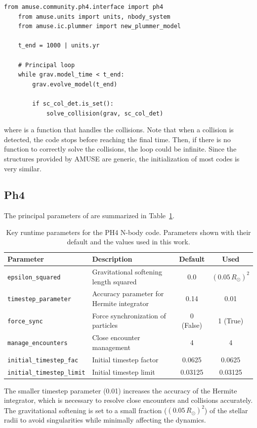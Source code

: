 \begin{lstlisting}[caption=Loop with evolution for \texttt{Ph4}, label=lst:Ph4_loop_evolve]
	from amuse.community.ph4.interface import ph4
	from amuse.units import units, nbody_system
	from amuse.ic.plummer import new_plummer_model
	
	t_end = 1000 | units.yr
	
	# Principal loop
	while grav.model_time < t_end:
		grav.evolve_model(t_end)
		
		if sc_col_det.is_set():
			solve_collision(grav, sc_col_det)
\end{lstlisting}
where  is a function that handles the collisions. Note that when a collision is detected, the code stops before reaching the final time. Then, if there is no function to correctly solve the collisions, the loop could be infinite. Since the structures provided by AMUSE are generic, the initialization of most codes is very similar.

\subsection{Ph4}

The principal parameters of  are summarized in Table~\ref{tab:ph4_parameters}.

\begin{table}[!ht]
	\centering
	\begin{threeparttable}
		\begin{tabular}{l p{5.5cm} c c}
			\hline
			\rowcolor[gray]{0.8}
			\textbf{Parameter} & \textbf{Description} & \textbf{Default} & \textbf{Used} \\
			\hline
			\texttt{epsilon\_squared} & Gravitational softening length squared & $0.0$ & $(0.05\,R_\odot)^2$ \\
			\texttt{timestep\_parameter} & Accuracy parameter for Hermite integrator & 0.14 & 0.01 \\
			\texttt{force\_sync} & Force synchronization of particles & 0 (False) & 1 (True) \\
			\texttt{manage\_encounters} & Close encounter management & 4 & 4 \\
			\texttt{initial\_timestep\_fac} & Initial timestep factor & 0.0625 & 0.0625 \\
			\texttt{initial\_timestep\_limit} & Initial timestep limit & 0.03125 & 0.03125 \\
			\hline
		\end{tabular}
		\begin{tablenotes}
			\item The smaller timestep parameter (0.01) increases the accuracy of the Hermite integrator, which is necessary to resolve close encounters and collisions accurately. The gravitational softening is set to a small fraction ($(0.05\,R_\odot)^2$) of the stellar radii to avoid singularities while minimally affecting the dynamics.
		\end{tablenotes}
	\end{threeparttable}
	\caption{Key runtime parameters for the PH4 N-body code. Parameters shown with their default and the values used in this work.}
	\label{tab:ph4_parameters}
\end{table}

